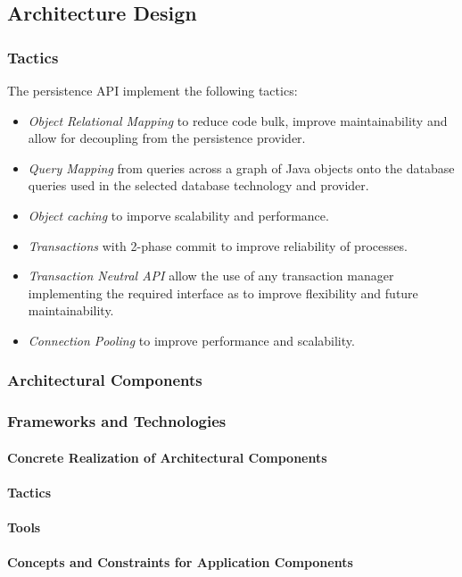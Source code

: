 \subsection{Architecture Design}
\subsubsection{Tactics}
The persistence API implement the following tactics:
\begin{itemize}
	\item \textit{Object Relational Mapping} to reduce code bulk, improve
		maintainability and allow for decoupling from the persistence 
		provider.
	\item \textit{Query Mapping} from queries across a graph of Java objects
		onto the database queries used in the selected database 
		technology and provider.
	\item \textit{Object caching} to imporve scalability and performance.
	\item \textit{Transactions} with 2-phase commit to improve reliability
		of processes.
	\item \textit{Transaction Neutral API} allow the use of any transaction manager
		implementing the required interface as to improve flexibility and
		future maintainability.
	\item \textit{Connection Pooling} to improve performance and scalability.
\end{itemize}

\subsubsection{Architectural Components}
\subsubsection{Frameworks and Technologies}
\paragraph{Concrete Realization of Architectural Components}
\paragraph{Tactics}
\paragraph{Tools}
\paragraph{Concepts and Constraints for Application Components}